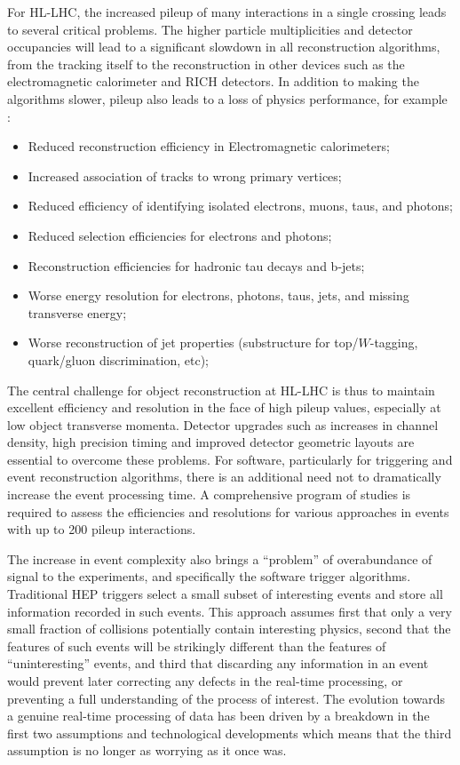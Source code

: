 For HL-LHC, the increased pileup of many interactions in a single crossing leads to several critical problems. The higher particle multiplicities and detector occupancies will lead 
to a significant slowdown in all reconstruction algorithms, from the tracking itself to the reconstruction in other devices such as the electromagnetic calorimeter and RICH detectors. 
In addition to making the algorithms slower, pileup also leads to a loss of physics performance, for example :
\begin{itemize}
\item Reduced reconstruction efficiency in Electromagnetic calorimeters;
\item Increased association of tracks to wrong primary vertices;
\item Reduced efficiency of identifying isolated electrons, muons, taus, and photons;
\item Reduced selection efficiencies for electrons and photons;
\item Reconstruction efficiencies for hadronic tau decays and b-jets;
\item Worse energy resolution for electrons, photons, taus, jets, and missing transverse energy;
\item Worse reconstruction of jet properties (substructure for top/$W$-tagging, quark/gluon discrimination, etc);
\end{itemize}

The central challenge for object reconstruction at HL-LHC is thus to maintain excellent efficiency and resolution in the face of high pileup values, especially at low object transverse momenta. 
Detector upgrades such as increases in channel density, high precision timing and improved detector geometric layouts are essential to overcome these problems. For software, particularly for 
triggering and event reconstruction algorithms, there is an additional need not to dramatically increase the event processing time. A comprehensive program of studies is required to assess the 
efficiencies and resolutions for various approaches in events with up to 200 pileup interactions. 

The increase in event complexity also brings a ``problem'' of overabundance of signal to the experiments, and specifically the software trigger algorithms. Traditional HEP triggers select a small 
subset of interesting events and store all information recorded in such events. This approach assumes first that only a very small fraction of collisions potentially contain interesting physics, 
second that the features of such events will be strikingly different than the features of ``uninteresting'' events, and third that discarding any information in an event would prevent later correcting 
any defects in the real-time processing, or preventing a full understanding of the process of interest. The evolution towards a genuine real-time processing of data has been driven by a breakdown 
in the first two assumptions and technological developments which means that the third assumption is no longer as worrying as it once was.

